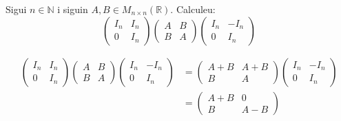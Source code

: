 \begin{exercise}[1.8.8]
    Sigui $n\in\mathbb{N}$ i siguin $A,B\in M_{n\times n}(\mathbb{R})$. Calculeu: 
    \[
    \left(
    \begin{array}{c|c}
    I_n & I_n \\ \hline
    0 & I_n 
    \end{array}
    \right)    
    \left(
    \begin{array}{c|c}
    A & B \\ \hline
    B & A
    \end{array}
    \right)
    \left(
    \begin{array}{c|c}
    I_n & -I_n \\ \hline
    0 & I_n
    \end{array}
    \right)
    \]

\end{exercise}

\begin{solution}
    \begin{align}
    \left(
    \begin{array}{c|c}
    I_n & I_n \\ \hline
    0 & I_n 
    \end{array}
    \right)    
    \left(
    \begin{array}{c|c}
    A & B \\ \hline
    B & A
    \end{array}
    \right)
    \left(
    \begin{array}{c|c}
    I_n & -I_n \\ \hline
    0 & I_n
    \end{array}
    \right)&=
        \left(
    \begin{array}{c|c}
    A+B & A+B \\ \hline
    B & A
    \end{array}
    \right)
    \left(
    \begin{array}{c|c}
    I_n & -I_n \\ \hline
    0 & I_n
    \end{array}
    \right)\\
    &=
    \left(
    \begin{array}{c|c}
    A+B & 0 \\ \hline
    B & A-B
    \end{array}
    \right)
\end{align}
\end{solution}


